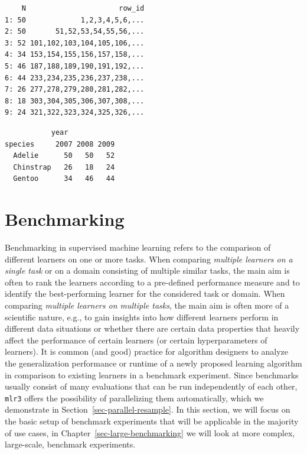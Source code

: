 \begin{verbatim}
    N                      row_id
1: 50             1,2,3,4,5,6,...
2: 50       51,52,53,54,55,56,...
3: 52 101,102,103,104,105,106,...
4: 34 153,154,155,156,157,158,...
5: 46 187,188,189,190,191,192,...
6: 44 233,234,235,236,237,238,...
7: 26 277,278,279,280,281,282,...
8: 18 303,304,305,306,307,308,...
9: 24 321,322,323,324,325,326,...
\end{verbatim}

\begin{Shaded}
\begin{Highlighting}[]
\SpecialCharTok{$}\NormalTok{(} \NormalTok{(}\NormalTok{, }\NormalTok{)))}
\end{Highlighting}
\end{Shaded}

\begin{verbatim}
           year
species     2007 2008 2009
  Adelie      50   50   52
  Chinstrap   26   18   24
  Gentoo      34   46   44
\end{verbatim}

\hypertarget{sec-benchmarking}{%
\section{Benchmarking}\label{sec-benchmarking}}

Benchmarking in supervised machine learning refers to the comparison of
different learners on one or more tasks. When comparing \emph{multiple
learners on a single task} or on a domain consisting of multiple similar
tasks, the main aim is often to rank the learners according to a
pre-defined performance measure and to identify the best-performing
learner for the considered task or domain. When comparing \emph{multiple
learners on multiple tasks}, the main aim is often more of a scientific
nature, e.g., to gain insights into how different learners perform in
different data situations or whether there are certain data properties
that heavily affect the performance of certain learners (or certain
hyperparameters of learners). It is common (and good) practice for
algorithm designers to analyze the generalization performance or runtime
of a newly proposed learning algorithm in comparison to existing
learners in a benchmark experiment. Since
benchmarks usually consist of many evaluations that can be run
independently of each other, \texttt{mlr3} offers the possibility of
parallelizing them automatically, which we demonstrate in
Section~\ref{sec-parallel-resample}. In this section, we will focus on
the basic setup of benchmark experiments that will be applicable in the
majority of use cases, in Chapter~\ref{sec-large-benchmarking} we will
look at more complex, large-scale, benchmark experiments.

